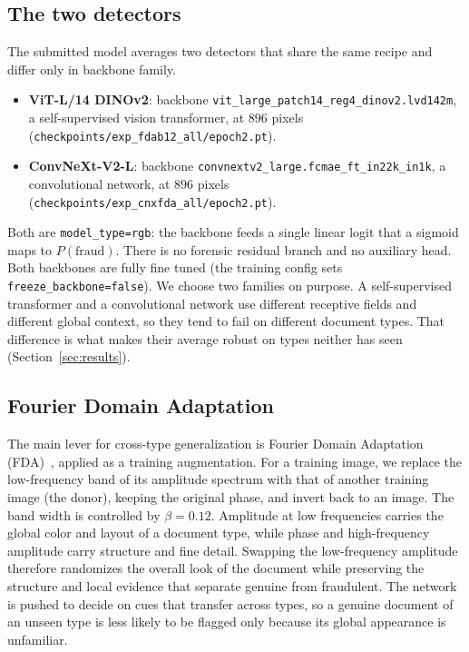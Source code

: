 \documentclass[11pt,a4paper]{article}
\begin{document}
\subsection{The two detectors}
\label{sec:models}
The submitted model averages two detectors that share the same recipe and differ only in backbone family.
\begin{itemize}[leftmargin=1.2em,itemsep=1pt,topsep=2pt]
  \item \textbf{ViT-L/14 DINOv2}: backbone \texttt{vit\_large\_patch14\_reg4\_dinov2.lvd142m}, a
        self-supervised vision transformer, at $896$ pixels
        (\texttt{checkpoints/exp\_fdab12\_all/epoch2.pt}).
  \item \textbf{ConvNeXt-V2-L}: backbone \texttt{convnextv2\_large.fcmae\_ft\_in22k\_in1k}, a convolutional
        network, at $896$ pixels (\texttt{checkpoints/exp\_cnxfda\_all/epoch2.pt}).
\end{itemize}
Both are \texttt{model\_type=rgb}: the backbone feeds a single linear logit that a sigmoid maps to
$P(\text{fraud})$. There is no forensic residual branch and no auxiliary head. Both backbones are fully fine
tuned (the training config sets \texttt{freeze\_backbone=false}). We choose two families on purpose. A
self-supervised transformer and a convolutional network use different receptive fields and different global
context, so they tend to fail on different document types. That difference is what makes their average robust
on types neither has seen (Section~\ref{sec:results}).

\subsection{Fourier Domain Adaptation}
\label{sec:fda}
The main lever for cross-type generalization is Fourier Domain Adaptation (FDA)~\cite{fda}, applied as a
training augmentation. For a training image, we replace the low-frequency band of its amplitude spectrum with
that of another training image (the donor), keeping the original phase, and invert back to an image. The
band width is controlled by $\beta=0.12$. Amplitude at low frequencies carries the global color and layout
of a document type, while phase and high-frequency amplitude carry structure and fine detail. Swapping the
low-frequency amplitude therefore randomizes the overall look of the document while preserving the structure
and local evidence that separate genuine from fraudulent. The network is pushed to decide on cues that
transfer across types, so a genuine document of an unseen type is less likely to be flagged only because its
global appearance is unfamiliar.
\end{document}
